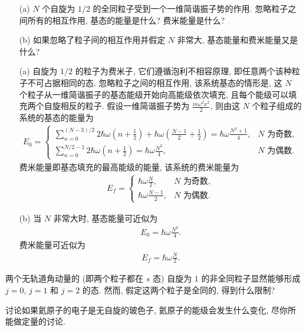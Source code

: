 \documentclass{assignment}
\begin{document}
\begin{prob}[课本习题 7.2]
    \begin{itemize}
        \item[(a)] $N$ 个自旋为 $1/2$ 的全同粒子受到一个一维简谐振子势的作用. 忽略粒子之间所有的相互作用, 基态的能量是什么? 费米能量是什么?
        \item[(b)] 如果忽略了粒子间的相互作用并假定 $N$ 非常大, 基态能量和费米能量又是什么?
    \end{itemize}
\end{prob}
\begin{sol}
    \begin{itemize}
        \item[(a)] 自旋为 $1/2$ 的粒子为费米子, 它们遵循泡利不相容原理, 即任意两个该种粒子不可占据相同的态. 忽略粒子之间的相互作用, 该系统基态的情形是, 这 $N$ 个粒子从一维简谐振子的基态能级开始向高能级依次填充, 且每个能级可以填充两个自旋相反的粒子. 假设一维简谐振子势为 $\frac{m\omega^2x^2}{2}$, 则由这 $N$ 个粒子组成的系统的基态的能量为
        \begin{align}
            E_0=\left\{\begin{array}{ll}
                \sum_{n=0}^{(N-3)/2}2\hbar\omega\left(n+\frac{1}{2}\right)+\hbar\omega\left(\frac{N-1}{2}+\frac{1}{2}\right)=\hbar\omega\frac{N^2+1}{4},&N\text{ 为奇数},\\
                \sum_{n=0}^{N/2-1}2\hbar\omega\left(n+\frac{1}{2}\right)=\hbar\omega\frac{N^2}{4},&N\text{ 为偶数}.
            \end{array}\right.
        \end{align}
        费米能量即基态填充的最高能级的能量, 该系统的费米能量为
        \begin{align}
            E_f=\left\{\begin{array}{ll}
                \hbar\omega\frac{N}{2},&N\text{ 为奇数},\\
                \hbar\omega\frac{N-1}{2},&N\text{ 为偶数}.
            \end{array}\right.
        \end{align}
        \item[(b)] 当 $N$ 非常大时, 基态能量可近似为
        \begin{align}
            E_0=\hbar\omega\frac{N^2}{4}.
        \end{align}
        费米能量可近似为
        \begin{align}
            E_f=\hbar\omega\frac{N}{2}.
        \end{align}
    \end{itemize}
\end{sol}

\begin{prob}[课本习题 7.3]
    两个无轨道角动量的 (即两个粒子都在 $s$ 态) 自旋为 $1$ 的非全同粒子显然能够形成 $j=0$, $j=1$ 和 $j=2$ 的态. 然而, 假定这两个粒子是全同的, 得到什么限制?
\end{prob}
\begin{pf}
    
\end{pf}

\begin{prob}[课本习题 7.4]
    讨论如果氦原子的电子是无自旋的玻色子, 氦原子的能级会发生什么变化, 尽你所能做定量的讨论.
\end{prob}
\begin{sol}
    
\end{sol}
\end{document}

